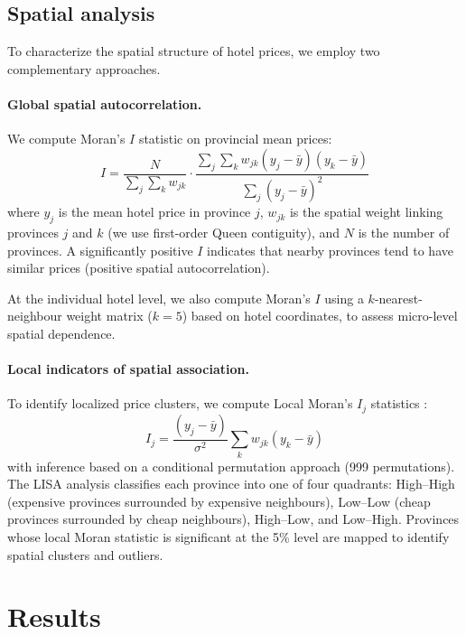 \documentclass[12pt,a4paper]{article}
\begin{document}
\subsection{Spatial analysis}
\label{sec:spatial_methods}

To characterize the spatial structure of hotel prices, we employ two complementary approaches.

\paragraph{Global spatial autocorrelation.}
We compute Moran's $I$ statistic \citep{moran1950notes} on provincial mean prices:
\begin{equation}
I = \frac{N}{\sum_{j}\sum_{k} w_{jk}} \cdot \frac{\sum_{j}\sum_{k} w_{jk}(y_j - \bar{y})(y_k - \bar{y})}{\sum_{j}(y_j - \bar{y})^2}
\end{equation}
where $y_j$ is the mean hotel price in province $j$, $w_{jk}$ is the spatial weight linking provinces $j$ and $k$ (we use first-order Queen contiguity), and $N$ is the number of provinces. A significantly positive $I$ indicates that nearby provinces tend to have similar prices (positive spatial autocorrelation).

At the individual hotel level, we also compute Moran's $I$ using a $k$-nearest-neighbour weight matrix ($k=5$) based on hotel coordinates, to assess micro-level spatial dependence.

\paragraph{Local indicators of spatial association.}
To identify localized price clusters, we compute Local Moran's $I_j$ statistics \citep{anselin1995local}:
\begin{equation}
I_j = \frac{(y_j - \bar{y})}{\sigma^2} \sum_{k} w_{jk}(y_k - \bar{y})
\end{equation}
with inference based on a conditional permutation approach (999 permutations). The LISA analysis classifies each province into one of four quadrants: High--High (expensive provinces surrounded by expensive neighbours), Low--Low (cheap provinces surrounded by cheap neighbours), High--Low, and Low--High. Provinces whose local Moran statistic is significant at the 5\% level are mapped to identify spatial clusters and outliers.

\section{Results}
\label{sec:results}
\end{document}
